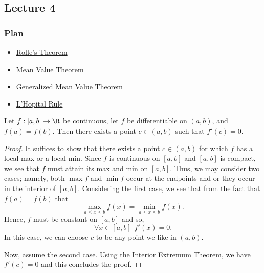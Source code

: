 \subsection{Lecture 4}

\subsubsection{Plan}

\begin{itemize}
    \item {\hyperref[Rolle's Theorem]{Rolle's Theorem}} 
    \item {\hyperref[Mean Value Theorem]{Mean Value Theorem}} 
    \item {\hyperref[Generalized Mean Value Theorem]{Generalized Mean Value Theorem}} 
    \item {\hyperref[L'Hopital's Rule]{L'Hopital Rule}} 
\end{itemize}

\begin{theorem}\label{Rolle's Theorem}
    Let \( f: [a,b] \to \R  \) be continuous, let \( f  \) be differentiable on \( (a,b) \), and \( f(a) = f(b) \). Then there exists a point \( c \in (a,b) \) such that \( f'(c) = 0  \). 
\end{theorem}

\begin{proof}
    It suffices to show that there exists a point \( c \in (a,b)  \) for which \( f  \) has a local max or a local min. Since \( f  \) is continuous on \( [a,b] \) and \( [a,b]  \) is compact, we see that \( f  \) must attain its max and min on \( [a,b] \). Thus, we may consider two cases; namely, both \( \max f  \) and \( \min f  \) occur at the endpoints and or they occur in the interior of \( [a,b] \). Considering the first case, we see that from the fact that \( f(a) = f(b) \) that   
    \[  \max_{a \leq x \leq b } f(x) = \min_{a \leq x \leq b } f(x). \]
    Hence, \( f \) must be constant on \( [a,b] \) and so, 
    \[  \forall  x \in [a,b] \ \ f'(x) = 0.  \]
    In this case, we can choose \( c  \) to be any point we like in \( (a,b) \).  

    Now, assume the second case. Using the Interior Extremum Theorem, we have \( f'(c) = 0  \) and this concludes the proof.  
\end{proof}

